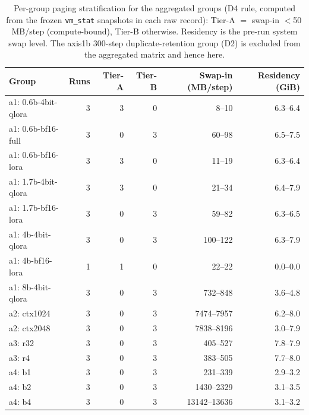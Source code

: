 \begin{table}[t]\centering
\caption{Per-group paging stratification for the aggregated groups (D4 rule, computed from the frozen \texttt{vm\_stat} snapshots in each raw record): Tier-A $=$ swap-in $<$50\,MB/step (compute-bound), Tier-B otherwise. Residency is the pre-run system swap level. The axis1b 300-step duplicate-retention group (D2) is excluded from the aggregated matrix and hence here.}
\label{tab:tier}
\footnotesize\setlength{\tabcolsep}{4pt}
\begin{tabular}{lrrrrr}
\toprule
Group & Runs & Tier-A & Tier-B & Swap-in (MB/step) & Residency (GiB)\\
\midrule
a1: 0.6b-4bit-qlora & 3 & 3 & 0 & 8--10 & 6.3--6.4\\
a1: 0.6b-bf16-full & 3 & 0 & 3 & 60--98 & 6.5--7.5\\
a1: 0.6b-bf16-lora & 3 & 3 & 0 & 11--19 & 6.3--6.4\\
a1: 1.7b-4bit-qlora & 3 & 3 & 0 & 21--34 & 6.4--7.9\\
a1: 1.7b-bf16-lora & 3 & 0 & 3 & 59--82 & 6.3--6.5\\
a1: 4b-4bit-qlora & 3 & 0 & 3 & 100--122 & 6.3--7.9\\
a1: 4b-bf16-lora & 1 & 1 & 0 & 22--22 & 0.0--0.0\\
a1: 8b-4bit-qlora & 3 & 0 & 3 & 732--848 & 3.6--4.8\\
a2: ctx1024 & 3 & 0 & 3 & 7474--7957 & 6.2--8.0\\
a2: ctx2048 & 3 & 0 & 3 & 7838--8196 & 3.0--7.9\\
a3: r32 & 3 & 0 & 3 & 405--527 & 7.8--7.9\\
a3: r4 & 3 & 0 & 3 & 383--505 & 7.7--8.0\\
a4: b1 & 3 & 0 & 3 & 231--339 & 2.9--3.2\\
a4: b2 & 3 & 0 & 3 & 1430--2329 & 3.1--3.5\\
a4: b4 & 3 & 0 & 3 & 13142--13636 & 3.1--3.2\\
\bottomrule
\end{tabular}
\end{table}
